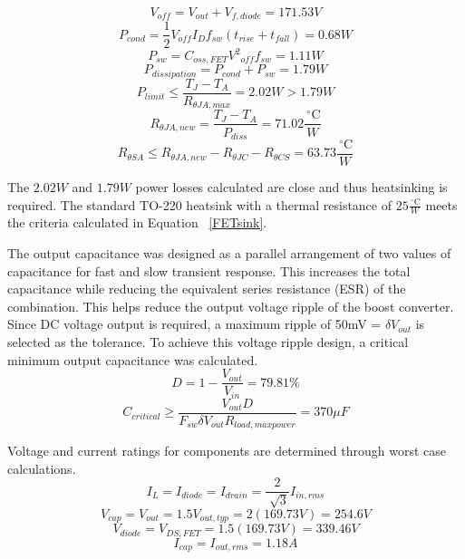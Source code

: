 \begin{equation}
V_{off} = V_{out} + V_{f,diode} = 171.53V
\end{equation} 
\begin{equation}
P_{cond} = \frac{1}{2}V_{off}I_Df_{sw}(t_{rise}+t_{fall}) = 0.68W
\end{equation}
\begin{equation}
P_{sw} = C_{oss,FET}{V^2}_{off}f_{sw} = 1.11W
\end{equation}
\begin{equation}
P_{dissipation} = P_{cond} + P_{sw} = 1.79W
\end{equation}
\begin{equation}
P_{limit} \leq \frac{T_J-T_A}{R_{\theta JA,max}} = 2.02W > 1.79W
\end{equation}
\begin{equation}
R_{\theta JA,new} = \frac{T_J-T_A}{P_{diss}} = 71.02\frac{\,^{\circ}\mathrm{C}}{W}
\end{equation}
\begin{equation}
R_{\theta SA} \leq R_{\theta JA,new} - R_{\theta JC} - R_{\theta CS} = 63.73\frac{\,^{\circ}\mathrm{C}}{W}
\label{FETsink}
\end{equation}

The $2.02W $ and $ 1.79W$ power losses calculated are close and thus heatsinking is required. The standard TO-220 heatsink with a thermal resistance of $25\frac{\,^{\circ}\mathrm{C}}{W}$ meets the criteria calculated in Equation ~\ref{FETsink}.

The output capacitance was designed as a parallel arrangement of two values of capacitance for fast and slow transient response. This increases the total capacitance while reducing the equivalent series resistance (ESR) of the combination. This helps reduce the output voltage ripple of the boost converter. Since DC voltage output is required, a maximum ripple of 50mV = $\delta V_{out}$ is selected as the tolerance. To achieve this voltage ripple design, a critical minimum output capacitance was calculated.\cite{hasaneen}
\begin{equation}
D = 1 - \frac{V_{out}}{V_{in}} = 79.81\% 
\end{equation}
\begin{equation}
C_{critical} \ge \frac{V_{out}D}{F_{sw}\delta V_{out}R_{load,maxpower}} = 370 \mu F
\end{equation}

Voltage and current ratings for components are determined through worst case calculations.\cite{kwasinski} 
\begin{equation}
I_L = I_{diode} = I_{drain} = \frac{2}{\sqrt[]{3}}I_{in,rms} 
\end{equation}
\begin{equation}
 V_{cap} = V_{out} = 1.5V_{out,typ} = 2(169.73V) = 254.6V 
\end{equation}
\begin{equation}
 V_{diode} = V_{DS,FET} = 1.5(169.73V) =339.46V  
\end{equation}
\begin{equation}
I_{cap} = I_{out,rms} = 1.18A 
\end{equation}

